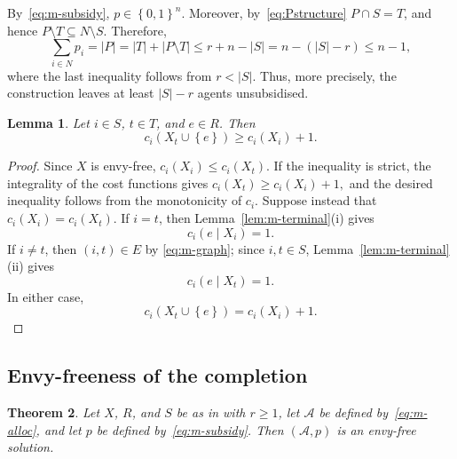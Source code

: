 \documentclass[sigconf,anonymous]{aamas}
\newcommand{\alloc}{\mathcal{A}}
\newcommand{\subsidy}{p}
\newcommand{\cost}{c}
\newcommand{\set}[1]{\left\{#1\right\}}
\theoremstyle{acmplain}
\newtheorem{theorem}{Theorem}[section]
\newtheorem{lemma}[theorem]{Lemma}
\theoremstyle{acmdefinition}
\theoremstyle{acmplain}
\begin{document}
By~\eqref{eq:m-subsidy}, $\subsidy\in\set{0,1}^n$. Moreover, by~\eqref{eq:Pstructure} $P\cap S=T$, and hence $P\setminus T\subseteq N\setminus S$. Therefore,
\begin{equation}
\label{eq_1}
\sum_{i\in N}p_i
 = |P|
 = |T|+|P\setminus T|
 \le r+n-|S|
 = n-(|S|-r)
 \le n-1,
\end{equation}
where the last inequality follows from $r<|S|$. Thus, more precisely, the construction leaves at least $|S|-r$ agents unsubsidised.

\begin{lemma}
\label{lem:m-expensive}
Let $i\in S$, $t\in T$, and $e\in R$. Then
\[
    \cost_i(X_t\cup\set e)\geq \cost_i(X_i)+1.
\]
\end{lemma}

\begin{proof}
Since $X$ is envy-free, \( \cost_i(X_i)\leq \cost_i(X_t). \) If the inequality is strict, the integrality of the cost functions gives \( \cost_i(X_t)\geq \cost_i(X_i)+1, \) and the desired inequality follows from the monotonicity of $\cost_i$. Suppose instead that \(   \cost_i(X_i)=\cost_i(X_t). \) If $i=t$, then Lemma~\ref{lem:m-terminal}(i) gives
\[
    \cost_i(e\mid X_i)=1.
\]
If $i\neq t$, then $(i,t)\in E$ by \eqref{eq:m-graph}; since $i,t\in S$, Lemma~\ref{lem:m-terminal}(ii) gives
\[
    \cost_i(e\mid X_t)=1.
\] In either case,
\[
    \cost_i(X_t\cup\set e)=\cost_i(X_i)+1.
\]
\end{proof}
\subsection{Envy-freeness of the completion}
\label{sec:m-ef}
\begin{theorem}
\label{thm:m-completion}
Let $X$, $R$, and $S$ be as in  with $r\geq 1$, let $\alloc$ be defined by~\eqref{eq:m-alloc}, and let $\subsidy$ be defined by~\eqref{eq:m-subsidy}. Then $(\alloc,\subsidy)$ is an envy-free solution. \end{theorem}
\end{document}

